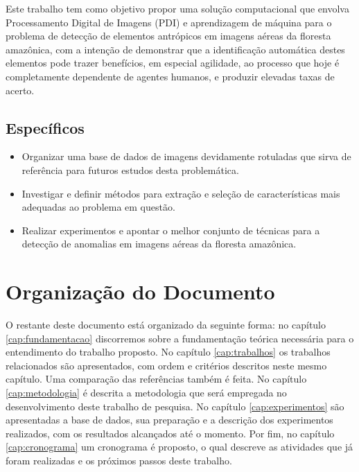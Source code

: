 Este trabalho tem como objetivo propor uma solução computacional que envolva Processamento Digital de Imagens (PDI) e aprendizagem de máquina para o problema de detecção de elementos antrópicos em imagens aéreas da floresta amazônica, com a intenção de demonstrar que a identificação automática destes elementos pode trazer benefícios, em especial agilidade, ao processo que hoje é completamente dependente de agentes humanos, e produzir elevadas taxas de acerto.

\subsection{Específicos}

\begin{itemize}
    \item Organizar uma base de dados de imagens devidamente rotuladas que sirva de referência para futuros estudos desta problemática.
    \item Investigar e definir métodos para extração e seleção de características mais adequadas ao problema em questão.
    \item Realizar experimentos e apontar o melhor conjunto de técnicas para a detecção de anomalias em imagens aéreas da floresta amazônica.
\end{itemize}

\section{Organização do Documento}

O restante deste documento está organizado da seguinte forma: no capítulo \ref{cap:fundamentacao} discorremos sobre a fundamentação teórica necessária para o entendimento do trabalho proposto. No capítulo \ref{cap:trabalhos} os trabalhos relacionados são apresentados, com ordem e critérios descritos neste mesmo capítulo. Uma comparação das referências também é feita. No capítulo \ref{cap:metodologia} é descrita a metodologia que será empregada no desenvolvimento deste trabalho de pesquisa. No capítulo \ref{cap:experimentos} são apresentadas a base de dados, sua preparação e a descrição dos experimentos realizados, com os resultados alcançados até o momento. Por fim, no capítulo \ref{cap:cronograma} um cronograma é proposto, o qual descreve as atividades que já foram realizadas e os próximos passos deste trabalho.

